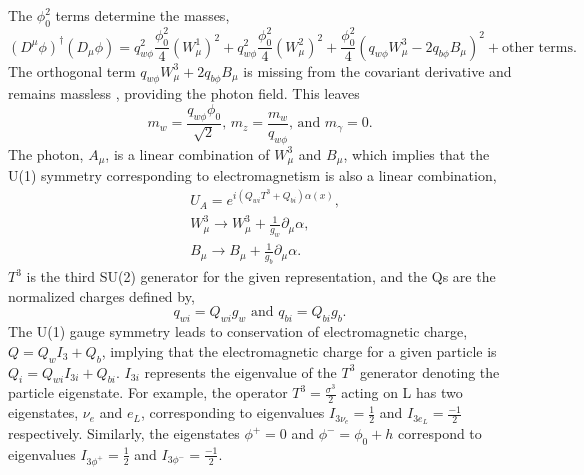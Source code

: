 \documentclass[12pt]{article}
\begin{document}
The $\phi_0^2$ terms determine the masses,
\begin{equation}
(D^\mu\phi)^\dagger(D_\mu\phi) = q^2_{w\phi}\frac{\phi_0^2}{4}(W^1_\mu)^2 + q^2_{w\phi}\frac{\phi_0^2}{4}(W^2_\mu)^2 
                                      + \frac{\phi_0^2}{4}(q_{w\phi}W^3_\mu - 2q_{b\phi}B_\mu)^2 + \text{other terms.}
\end{equation}
The orthogonal term $q_{w\phi}W^3_\mu + 2q_{b\phi}B_\mu$ is missing from the covariant derivative and remains massless \cite{qftam}, providing the photon field. This leaves 
\begin{equation}
m_{w} = \frac{q_{w\phi}\phi_0}{\sqrt{2}} \text{, }
m_z = \frac{m_w}{q_{w\phi}} \text{, and } m_\gamma = 0.
\end{equation}
The photon, $A_\mu$, is a linear combination of $W^3_\mu$ and $B_\mu$, which implies that the U(1) symmetry corresponding to electromagnetism is also a linear combination, 
\begin{equation}
\begin{split}
& U_A = e^{i(Q_{wi}T^3 + Q_{bi})\alpha(x)}, \\
& W^3_\mu \rightarrow W^3_\mu + \frac{1}{g_w}\partial_\mu\alpha, \\
& B_\mu \rightarrow B_\mu + \frac{1}{g_b}\partial_\mu\alpha.
\end{split}
\end{equation}
$T^3$ is the third SU(2) generator for the given representation, and the Qs are the normalized charges defined by,
\begin{equation}
q_{wi} = Q_{wi}g_w \text{ and } q_{bi} = Q_{bi}g_b.
\end{equation} 
The U(1) gauge symmetry leads to conservation of electromagnetic charge, $Q = Q_{w}I_{3} + Q_{b}$, implying that the electromagnetic charge for a given particle is $Q_i = Q_{wi}I_{3i} + Q_{bi}$. $I_{3i}$ represents the eigenvalue of the $T^3$ generator denoting the particle eigenstate. For example, the operator $T^3 = \frac{\sigma^3}{2}$ acting on L has two eigenstates, $\nu_e$ and $e_L$, corresponding to eigenvalues $I_{3\nu_e} = \frac{1}{2}$ and $I_{3e_L} = \frac{-1}{2}$ respectively. Similarly, the eigenstates $\phi^+ = 0$ and $\phi^- = \phi_0 + h$ correspond to eigenvalues $I_{3\phi^+} = \frac{1}{2}$ and $I_{3\phi^-} = \frac{-1}{2}$.  
\end{document}
